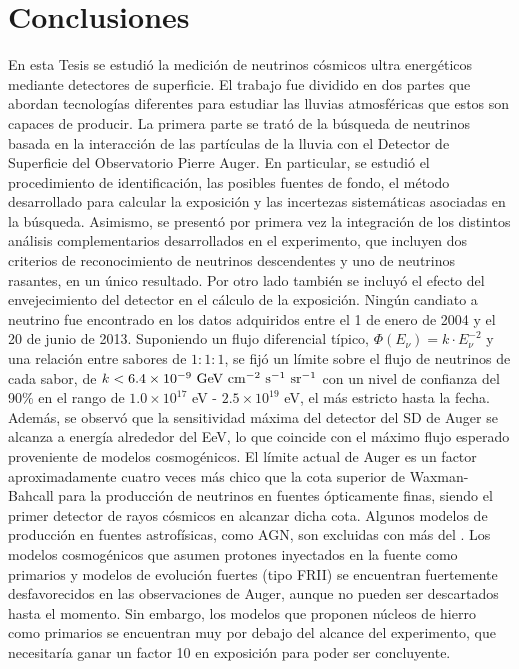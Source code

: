 \chapter{Conclusiones}
\label{ch:concl}

En esta Tesis se estudi\'o la medici\'on de neutrinos c\'osmicos ultra energ\'eticos mediante detectores de superficie. 
El trabajo fue dividido en dos partes que abordan tecnolog\'ias diferentes para estudiar las lluvias atmosf\'ericas que estos son capaces de producir.
La primera parte se trat\'o de la b\'usqueda de neutrinos basada en la interacci\'on de las part\'iculas de la lluvia con el Detector de Superficie del Observatorio Pierre Auger.
En particular, se estudi\'o el procedimiento de identificaci\'on, las posibles fuentes de fondo, el m\'etodo desarrollado para calcular la exposici\'on y las incertezas sistem\'aticas asociadas en la b\'usqueda.
Asimismo, se present\'o por primera vez la integraci\'on de los distintos an\'alisis complementarios desarrollados en el experimento, que incluyen dos criterios de reconocimiento de neutrinos descendentes y uno de neutrinos rasantes, en un \'unico resultado.
Por otro lado tambi\'en se incluy\'o el efecto del envejecimiento del detector en el c\'alculo de la exposici\'on.
Ning\'un candiato a neutrino fue encontrado en los datos adquiridos entre el 1 de enero de 2004 y el 20 de junio de 2013. 
Suponiendo un flujo diferencial t\'ipico, $\Phi(E_\nu)= k\cdot E^{-2}_\nu$ y una relaci\'on entre sabores de $1 : 1 : 1$, se fij\'o un l\'imite sobre el flujo de neutrinos de cada sabor, de $k < 6.4 \times 10^{-9}~{\rm GeV~cm^{-2}~s^{-1}~sr^{-1}}$ con un nivel de confianza del 90\% en el rango de ${1.0 \times 10^{17}}$ {eV} - ${2.5 \times 10^{19}}$ {eV}, el m\'as estricto hasta la fecha.
Adem\'as, se observ\'o que la sensitividad m\'axima del detector del SD de Auger se alcanza a energ\'ia alrededor del EeV, lo que coincide con el m\'aximo flujo esperado proveniente de modelos cosmog\'enicos.
El l\'imite actual de Auger es un factor aproximadamente cuatro veces m\'as chico que la cota superior de Waxman-Bahcall para la producci\'on de neutrinos en fuentes \'opticamente finas,
siendo el primer detector de rayos c\'osmicos en alcanzar dicha cota.
Algunos modelos de producci\'on en fuentes astrof\'isicas, como AGN, son excluidas con m\'as del .
Los modelos cosmog\'enicos que asumen protones inyectados en la fuente como primarios y modelos de evoluci\'on fuertes (tipo FRII) se encuentran fuertemente desfavorecidos en las observaciones de Auger, aunque no pueden ser descartados hasta el momento.
Sin embargo, los modelos que proponen n\'ucleos de hierro como primarios se encuentran muy por debajo del alcance del experimento, que necesitar\'ia ganar un factor 10 en exposici\'on para poder ser concluyente.

